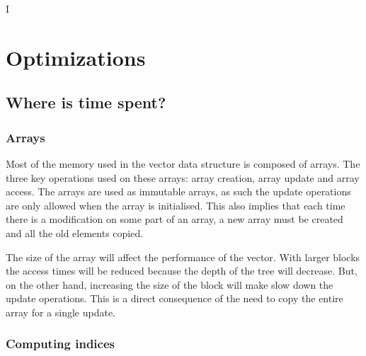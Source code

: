 I%

\chapter{Optimizations} %

\label{Optimizations} %



\section{Where is time spent?}


\subsection{Arrays}
Most of the memory used in the vector data structure is composed of arrays. The three key operations used on these arrays: array creation, array update and array access. The arrays are used as immutable arrays, as such the update operations are only allowed when the array is initialised. This also implies that each time there is a modification on some part of an array, a new array must be created and all the old elements copied. 

The size of the array will affect the performance of the vector. With larger blocks the access times will be reduced because the depth of the tree will decrease. But, on the other hand, increasing the size of the block will make slow down the update operations. This is a direct consequence of the need to copy the entire array for a single update.



\subsection{Computing indices}
\label{ComputingIndices}

